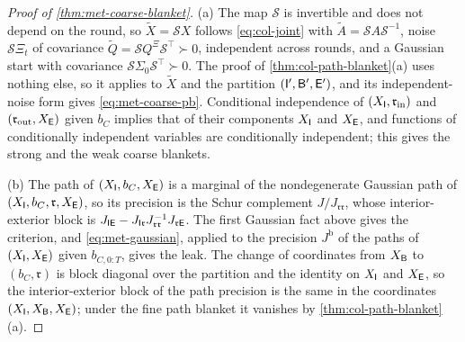 \begin{proof}[Proof of \cref{thm:met-coarse-blanket}]
(a) The map $\mathcal S$ is invertible and does not depend on the round, so $\tilde X=\mathcal SX$ follows \eqref{eq:col-joint} with $\tilde A=\mathcal SA\mathcal S^{-1}$, noise $\mathcal S\Xi_t$ of covariance $\tilde Q=\mathcal SQ^{\Xi}\mathcal S^\top\succ0$, independent across rounds, and a Gaussian start with covariance $\mathcal S\Sigma_0\mathcal S^\top\succ0$. The proof of \cref{thm:col-path-blanket}(a) uses nothing else, so it applies to $\tilde X$ and the partition $(\mathsf{I}',\mathsf{B}',\mathsf{E}')$, and its independent-noise form gives \eqref{eq:met-coarse-pb}. Conditional independence of $(X_{\mathsf{I}},\mathfrak r_{\mathrm{in}})$ and $(\mathfrak r_{\mathrm{out}},X_{\mathsf{E}})$ given $b_C$ implies that of their components $X_{\mathsf{I}}$ and $X_{\mathsf{E}}$, and functions of conditionally independent variables are conditionally independent; this gives the strong and the weak coarse blankets.

(b) The path of $(X_{\mathsf{I}},b_C,X_{\mathsf{E}})$ is a marginal of the nondegenerate Gaussian path of $(X_{\mathsf{I}},b_C,\mathfrak r,X_{\mathsf{E}})$, so its precision is the Schur complement $J/J_{\mathfrak r\mathfrak r}$, whose interior-exterior block is $J_{\mathsf{I}\mathsf{E}}-J_{\mathsf{I}\mathfrak r}J_{\mathfrak r\mathfrak r}^{-1}J_{\mathfrak r\mathsf{E}}$. The first Gaussian fact above gives the criterion, and \eqref{eq:met-gaussian}, applied to the precision $J^{\mathrm b}$ of the paths of $(X_{\mathsf{I}},X_{\mathsf{E}})$ given $b_{C,0:T}$, gives the leak. The change of coordinates from $X_{\mathsf{B}}$ to $(b_C,\mathfrak r)$ is block diagonal over the partition and the identity on $X_{\mathsf{I}}$ and $X_{\mathsf{E}}$, so the interior-exterior block of the path precision is the same in the coordinates $(X_{\mathsf{I}},X_{\mathsf{B}},X_{\mathsf{E}})$; under the fine path blanket it vanishes by \cref{thm:col-path-blanket}(a).
\end{proof}

